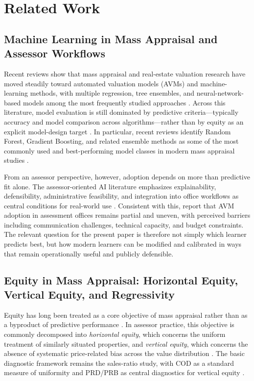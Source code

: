 \documentclass[12pt]{article}
\theoremstyle{plain}
\theoremstyle{definition}
\begin{document}
\section{Related Work}
\label{sec:related_work}

\subsection{Machine Learning in Mass Appraisal and Assessor Workflows}

Recent reviews show that mass appraisal and real-estate valuation research have moved steadily toward automated valuation models (AVMs) and machine-learning methods, with multiple regression, tree ensembles, and neural-network-based models among the most frequently studied approaches \cite{WangLi2019,Rootetal2023,Zilli2024,purdueAssessingTechniques}. Across this literature, model evaluation is still dominated by predictive criteria---typically accuracy and model comparison across algorithms---rather than by equity as an explicit model-design target \cite{WangLi2019,Rootetal2023,Zilli2024}. In particular, recent reviews identify Random Forest, Gradient Boosting, and related ensemble methods as some of the most commonly used and best-performing model classes in modern mass appraisal studies \cite{Rootetal2023,Sevgen2024100111,Zilli2024}.

From an assessor perspective, however, adoption depends on more than predictive fit alone. The assessor-oriented AI literature emphasizes explainability, defensibility, administrative feasibility, and integration into office workflows as central conditions for real-world use \cite{IAAOAITaskForce2022}. Consistent with this, \textcite{BidansetRakow2022} report that AVM adoption in assessment offices remains partial and uneven, with perceived barriers including communication challenges, technical capacity, and budget constraints. The relevant question for the present paper is therefore not simply which learner predicts best, but how modern learners can be modified and calibrated in ways that remain operationally useful and publicly defensible.

\subsection{Equity in Mass Appraisal: Horizontal Equity, Vertical Equity, and Regressivity}

Equity has long been treated as a core objective of mass appraisal rather than as a byproduct of predictive performance \cite{IAAO2013Ratio,IAAO2025Mass,Quintos2014}. In assessor practice, this objective is commonly decomposed into \emph{horizontal equity}, which concerns the uniform treatment of similarly situated properties, and \emph{vertical equity}, which concerns the absence of systematic price-related bias across the value distribution \cite{10578d49-78f8-3ef9-8277-9b6add2bd071,cornia2006property,McMillenSingh2023}. The basic diagnostic framework remains the sales-ratio study, with COD as a standard measure of uniformity and PRD/PRB as central diagnostics for vertical equity \cite{IAAO2013Ratio,IAAO2025Mass}.
\end{document}
